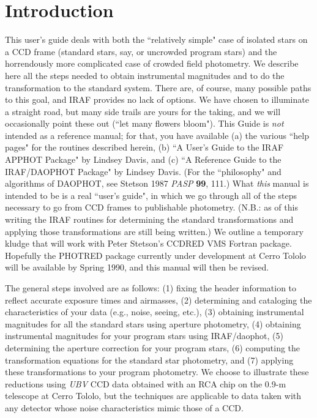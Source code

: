 \section{Introduction}
This user's guide deals with both the ``relatively simple" case of
isolated
stars on a CCD frame (standard stars, say, or uncrowded program stars)
and the horrendously more complicated case of crowded field
photometry. We describe here all the steps needed to obtain instrumental
magnitudes and to do the transformation to the standard system.  There
are, of course, many possible paths to this goal, and IRAF provides no
lack of options.  We have chosen to illuminate a straight road, but many
side trails are yours for the taking, and we will occasionally point
these out (``let many flowers bloom").  This Guide is {\it not} intended
as a reference manual; for that, you have available (a) the various
``help pages" for the routines described herein, (b) ``A User's Guide
to the IRAF APPHOT Package"  by Lindsey Davis, and (c) ``A Reference
Guide to the IRAF/DAOPHOT Package" by
Lindsey Davis.  (For the ``philosophy" and algorithms of DAOPHOT, see
Stetson 1987 {\it PASP} {\bf 99}, 111.) 
What {\it this} manual is intended to be is a real
``user's guide", in which we go through all of the steps necessary to go
from CCD frames to publishable photometry. (N.B.: as of this writing
the IRAF routines for determining the standard transformations and
applying those transformations are still being written.)  We outline
a temporary kludge that will work with Peter Stetson's CCDRED VMS
Fortran package.  Hopefully the PHOTRED package currently under
development at Cerro Tololo will be available by Spring 1990, and 
this manual will then be revised. 
  
The general steps involved are as follows: (1) fixing the header
information to reflect accurate exposure times and airmasses,
(2) determining and cataloging the characteristics of your data (e.g.,
noise, seeing, etc.), 
(3) obtaining instrumental magnitudes for all the standard stars
using aperture photometry, (4) obtaining instrumental magnitudes for
your program stars using IRAF/daophot, (5) determining the aperture
correction for your program stars, (6) computing the transformation
equations for the standard star photometry, and (7) applying these
transformations to your program photometry.  We choose to illustrate
these reductions using {\it UBV} CCD data obtained with an RCA chip on the 0.9-m
telescope at Cerro Tololo, but the techniques are applicable to data
taken with any detector whose noise characteristics mimic those of a
CCD.  
 

